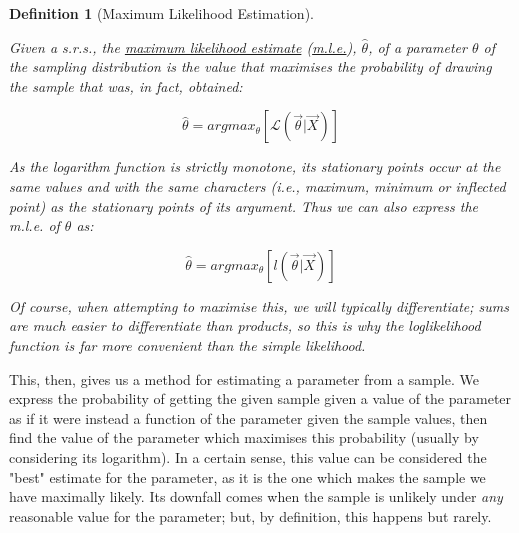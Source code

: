 \documentclass[12pt,a4paper]{article}
\newtheorem{defn}[thm]{Definition}
\begin{document}
\begin{defn}[Maximum Likelihood Estimation]$\;$\par\vspace{1cm}

Given a s.r.s., the \underline{maximum likelihood estimate} (\underline{m.l.e.}), $\hat{\theta}$, of a parameter $\theta$ of the sampling distribution is the value that maximises the probability of drawing the sample that was, in fact, obtained:

$$\hat{\theta} = argmax_\theta \left[\mathcal{L}\left(\vec{\theta} | \vec{X}\right)\right]$$

As the logarithm function is strictly monotone, its stationary points occur at the same values and with the same characters (i.e., maximum, minimum or inflected point) as the stationary points of its argument. Thus we can also express the m.l.e. of $\theta$ as:

$$\hat{\theta} = argmax_\theta \left[l\left(\vec{\theta} | \vec{X}\right)\right]$$

Of course, when attempting to maximise this, we will typically differentiate; sums are much easier to differentiate than products, so this is why the loglikelihood function is far more convenient than the simple likelihood.

\end{defn}

This, then, gives us a method for estimating a parameter from a sample. We express the probability of getting the given sample given a value of the parameter as if it were instead a function of the parameter given the sample values, then find the value of the parameter which maximises this probability (usually by considering its logarithm). In a certain sense, this value can be considered the "best" estimate for the parameter, as it is the one which makes the sample we have maximally likely. Its downfall comes when the sample is unlikely under \emph{any} reasonable value for the parameter; but, by definition, this happens but rarely.
\end{document}
